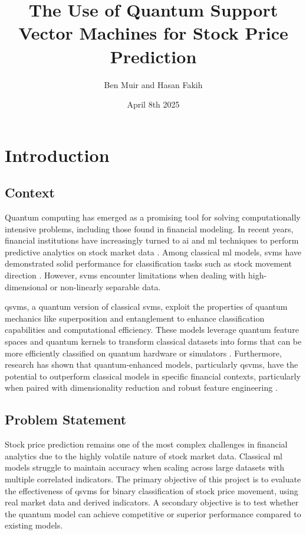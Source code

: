 \documentclass{article}
\title{The Use of Quantum Support Vector Machines for Stock Price Prediction}
\author{Ben Muir and Hasan Fakih}
\date{April 8th 2025}
\begin{document}
\maketitle
\section{Introduction}

\subsection{Context}

Quantum computing has emerged as a promising tool for solving computationally intensive problems, including those found in financial modeling. In recent years, financial institutions have increasingly turned to \gls{ai} and \gls{ml} techniques to perform predictive analytics on stock market data \cite{Xia24}. Among classical \gls{ml} models, \gls{svm}s have demonstrated solid performance for classification tasks such as stock movement direction \cite{Chhajer22}. However, \gls{svm}s encounter limitations when dealing with high-dimensional or non-linearly separable data.

\gls{qsvm}s, a quantum version of classical \gls{svm}s, exploit the properties of quantum mechanics like superposition and entanglement to enhance classification capabilities and computational efficiency. These models leverage quantum feature spaces and quantum kernels to transform classical datasets into forms that can be more efficiently classified on quantum hardware or simulators \cite{muir2025}. Furthermore, research has shown that quantum-enhanced models, particularly \gls{qsvm}s, have the potential to outperform classical models in specific financial contexts, particularly when paired with dimensionality reduction and robust feature engineering \cite{srivastava2023}.

\subsection{Problem Statement}

Stock price prediction remains one of the most complex challenges in financial analytics due to the highly volatile nature of stock market data. Classical \gls{ml} models struggle to maintain accuracy when scaling across large datasets with multiple correlated indicators. The primary objective of this project is to evaluate the effectiveness of \gls{qsvm}s for binary classification of stock price movement, using real market data and derived indicators. A secondary objective is to test whether the quantum model can achieve competitive or superior performance compared to existing models.
\end{document}
